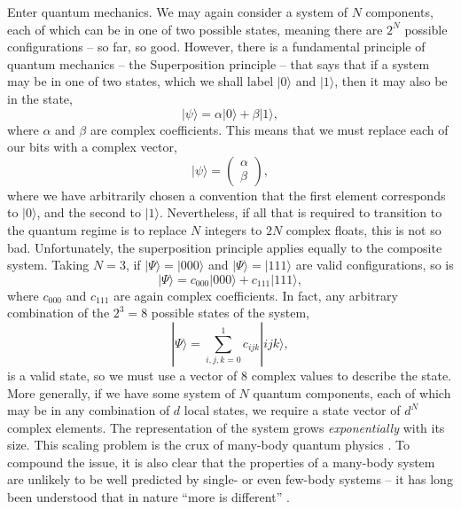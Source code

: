 Enter quantum mechanics. We may again consider a system of \(N\) components, each of which can be in one of two possible states, meaning there are \(2^{N}\) possible configurations -- so far, so good. However, there is a fundamental principle of quantum mechanics -- the Superposition principle -- that says that if a system may be in one of two states, which we shall label \(|0 \rangle\) and \(|1\rangle\), then it may also be in the state,
\begin{equation}
	| \psi \rangle = \alpha |0\rangle + \beta |1\rangle,
	\label{eq:mbq1-1}
\end{equation}
where \(\alpha\) and \(\beta\) are complex coefficients. This means that we must replace each of our bits with a complex vector,
\begin{equation}
	|\psi \rangle = \begin{pmatrix}
						\alpha \\
						\beta
					\end{pmatrix},
	\label{eq:mbq1-2}
\end{equation}
where we have arbitrarily chosen a convention that the first element corresponds to \(|0\rangle\), and the second to \(|1\rangle\). Nevertheless, if all that is required to transition to the quantum regime is to replace \(N\) integers to \(2N\) complex floats, this is not so bad. Unfortunately, the superposition principle applies equally to the composite system. Taking \(N=3\), if \(|\Psi\rangle = |000\rangle\) and \(|\Psi\rangle = |111\rangle\) are valid configurations, so is 
\begin{equation}  
	| \Psi \rangle = c_{000}|000 \rangle + c_{111}| 111 \rangle,
	\label{eq:mbq1-3}
\end{equation}
where \(c_{000}\) and \(c_{111}\) are again complex coefficients. In fact, any arbitrary combination of the \(2^{3} = 8\) possible states of the system,
\begin{equation}
	| \Psi \rangle = \sum^{1}_{i,j,k=0} c_{ijk} |ijk \rangle,
	\label{eq:mbq1-4}
\end{equation}
is a valid state, so we must use a vector of 8 complex values to describe the state. More generally, if we have some system of \(N\) quantum components, each of which may be in any combination of \(d\) local states, we require a state vector of \(d^{N}\) complex elements. The representation of the system grows \emph{exponentially} with its size. This scaling problem is the crux of many-body quantum physics \cite{Barnett_MS,NielsenChuang_CS}. To compound the issue, it is also clear that the properties of a many-body system are unlikely to be well predicted by single- or even few-body systems -- it has long been understood that in nature ``more is different'' \cite{Anderson72}.

